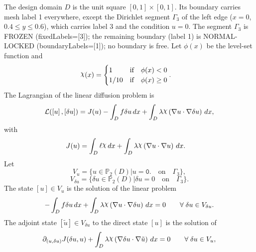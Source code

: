 \documentclass[preview]{standalone}
\let\oldcdot\cdot
\let\cdot\oldcdot
\begin{document}
The design domain $D$ is the unit square $[0,1]\times[0,1]$.  Its boundary carries mesh label 1 everywhere, except the Dirichlet segment $\Gamma_{3}$ of the left edge ($x=0$, $0.4\le y\le 0.6$), which carries label 3 and the condition $u=0$.  The segment $\Gamma_{3}$ is FROZEN (fixedLabels=[3]); the remaining boundary (label 1) is NORMAL-LOCKED (boundaryLabels=[1]); no boundary is free.
Let $\phi(x)$ be the level-set function and
 \begin{align*}\raisebox{\depth}{$\chi$}(x) &= \begin{cases} 1 & \mbox{if}\quad \phi(x) < 0 \\ 1/10 & \mbox{if}\quad \phi(x)  \ge 0 \end{cases}.\end{align*}
The Lagrangian of the linear diffusion problem is
\begin{dmath*}
\mathcal L(\left[ u\right],\left[ \delta u\right]) = J(u) -  \int_{D} f \delta u \,dx +  \int_{D} \lambda \raisebox{\depth}{$\chi$} \left(  \nabla u  \cdot  \nabla \delta u  \right) \,dx , 
\end{dmath*}
with 
\begin{align*}
J(u) &=  \int_{D} \ell \raisebox{\depth}{$\chi$} \,dx +  \int_{D} \lambda \raisebox{\depth}{$\chi$} \left(  \nabla u  \cdot  \nabla u  \right) \,dx.
 \end{align*}
Let
\begin{equation*}
V_{u} = \{ u \in \mathbb P_{2}(D)| u = \mathtt{\text{0.}}  \quad \text{{on}} \quad\Gamma_{3} \},\end{equation*}
\begin{equation*}
V_{\delta u} = \{ \delta u \in \mathbb P_{2}(D)| \delta u = 0  \quad \text{{on}} \quad\Gamma_{3} \}.\end{equation*}
The state $\left[ u\right] \in  V_{u}$ is the solution of the linear problem
\begin{dmath*}
-  \int_{D} f \delta u \,dx +  \int_{D} \lambda \raisebox{\depth}{$\chi$} \left(  \nabla u  \cdot  \nabla \delta u  \right) \,dx = 0\qquad \forall\; {\delta u\in V_{\delta u}} . 
\end{dmath*}
The adjoint state $\left[ \tilde u\right] \in  V_{\delta u}$ to the direct state $\left[ u\right]$ is the solution of
\begin{dmath*}
\partial_{(u,\delta u)} J(\delta u,u) +  \int_{D} \lambda \raisebox{\depth}{$\chi$} \left(  \nabla \delta u  \cdot  \nabla \tilde u  \right) \,dx = 0\qquad \forall\; {\delta u\in V_{u}} , 
\end{dmath*}
\end{document}

